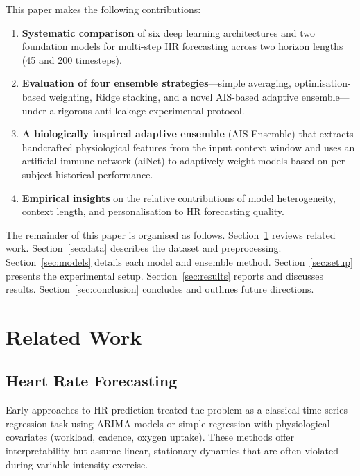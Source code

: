 \documentclass[11pt,a4paper]{article}
\begin{document}
This paper makes the following contributions:
\begin{enumerate}[leftmargin=*, label=\textbf{\arabic*.}]
  \item \textbf{Systematic comparison} of six deep learning architectures and two
        foundation models for multi-step HR forecasting across two horizon
        lengths (45 and 200 timesteps).
  \item \textbf{Evaluation of four ensemble strategies}—simple averaging,
        optimisation-based weighting, Ridge stacking, and a novel AIS-based
        adaptive ensemble—under a rigorous anti-leakage experimental protocol.
  \item \textbf{A biologically inspired adaptive ensemble} (AIS-Ensemble) that
        extracts handcrafted physiological features from the input context window
        and uses an artificial immune network (aiNet) to adaptively weight models
        based on per-subject historical performance.
  \item \textbf{Empirical insights} on the relative contributions of model
        heterogeneity, context length, and personalisation to HR forecasting
        quality.
\end{enumerate}

The remainder of this paper is organised as follows.
Section~\ref{sec:related} reviews related work.
Section~\ref{sec:data} describes the dataset and preprocessing.
Section~\ref{sec:models} details each model and ensemble method.
Section~\ref{sec:setup} presents the experimental setup.
Section~\ref{sec:results} reports and discusses results.
Section~\ref{sec:conclusion} concludes and outlines future directions.

\section{Related Work}
\label{sec:related}

\subsection{Heart Rate Forecasting}

Early approaches to HR prediction treated the problem as a classical time
series regression task using ARIMA models \cite{box2015} or simple regression
with physiological covariates (workload, cadence, oxygen uptake).  These
methods offer interpretability but assume linear, stationary dynamics that are
often violated during variable-intensity exercise.
\end{document}

